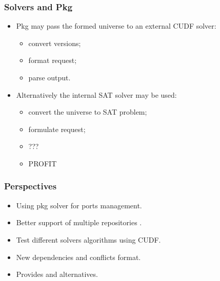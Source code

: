 \documentclass{beamer}
\begin{document}
\begin{frame}
\frametitle{Solvers and Pkg}
\begin{itemize}
  \item Pkg may pass the formed universe to an external CUDF solver:
  \begin{itemize}
    \item convert versions;
    \item format request;
    \item parse output.
  \end{itemize}
  \item Alternatively the internal SAT solver may be used:
  \begin{itemize}
    \item convert the universe to SAT problem;
    \item formulate request;
    \item ???
    \item PROFIT
  \end{itemize} 
\end{itemize}
\end{frame}

\begin{frame}
\frametitle{Perspectives}

\begin{itemize}
  \item Using pkg solver for ports management.
  \item Better support of multiple repositories .
  \item Test different solvers algorithms using CUDF.
  \item New dependencies and conflicts format.
  \item Provides and alternatives.
\end{itemize}
\end{frame}
\end{document}
